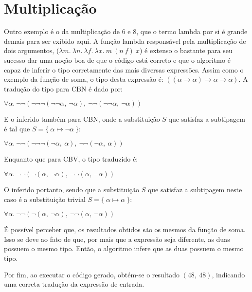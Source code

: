\section{Multiplicação}
Outro exemplo é o da multiplicação de 6 e 8, que o termo lambda por si é grande demais para ser exibido aqui.
A função lambda responsável pela multiplicação de dois argumentos, ($\lambda m.\ \lambda n.\ \lambda f.\ \lambda x.\ m\ (n\ f)\ x$) é extenso o bastante para seu sucesso dar uma noção boa de que o código está correto e que o algoritmo é capaz de inferir o tipo corretamente das mais diversas expressões.
Assim como o exemplo da função de soma, o tipo desta expressão é: $((\alpha \to \alpha) \to \alpha \to \alpha)$.
A tradução do tipo para CBN é dado por:
\lstset{extendedchars=false, escapeinside=''}
\begin{center}
  $\forall\alpha.\ \neg\neg(\neg\neg\neg(\neg\neg\alpha,\ \neg\alpha),\ \neg\neg(\neg\neg\alpha,\ \neg\alpha))$
\end{center}
E o inferido também para CBN, onde a substituição $S$ que satisfaz a subtipagem é tal que $S = \{\ \alpha \mapsto \neg\alpha\ \}$:
\lstset{extendedchars=false, escapeinside=''}
\begin{center}
  $\forall\alpha.\ \neg\neg(\neg\neg\neg(\neg\alpha,\ \alpha),\ \neg\neg(\neg\alpha,\ \alpha))$
\end{center}
Enquanto que para CBV, o tipo traduzido é:
\lstset{extendedchars=false, escapeinside=''}
\begin{center}
  $\forall\alpha.\ \neg\neg(\neg(\alpha,\ \neg\alpha),\ \neg\neg(\alpha,\ \neg\alpha))$
\end{center}
O inferido portanto, sendo que a substituição $S$ que satisfaz a subtipagem neste caso é a substituição trivial $S = \{\ \alpha \mapsto \alpha\ \}$:
\lstset{extendedchars=false, escapeinside=''}
\begin{center}
  $\forall\alpha.\ \neg\neg(\neg(\alpha,\ \neg\alpha),\ \neg\neg(\alpha,\ \neg\alpha))$
\end{center}
É possível perceber que, os resultados obtidos são os mesmos da função de soma.
Isso se deve ao fato de que, por mais que a expressão seja diferente, as duas possuem o mesmo tipo.
Então, o algoritmo infere que as duas possuem o mesmo tipo.

Por fim, ao executar o código gerado, obtém-se o resultado $(48,\ 48)$, indicando uma correta tradução da expressão de entrada.
